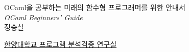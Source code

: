 \thispagestyle{empty}


\newcommand*{\titleSW}{\begingroup%
\raggedleft
\vspace*{\baselineskip}
{\Huge \sffamily OCaml을 공부하는
미래의 함수형 프로그래머를 위한
안내서}\\[\baselineskip]
{\Large\itshape OCaml Beginners' Guide}\\[0.2\textheight]
{\Large 정승철}\par
\vfill
{\Large \sffamily \href{http://pav.hanyang.ac.kr}{한양대학교 프로그램 분석검증 연구실}}
\vspace*{\baselineskip}
\endgroup}

\titleSW
\newpage

\setcounter{page}{1}

